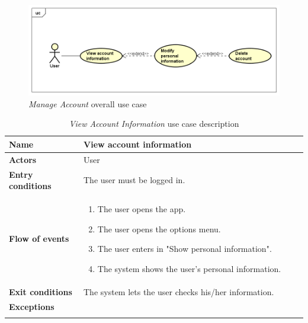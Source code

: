 \begin{figure}[h]
	\includegraphics[width=\textwidth, height=\textheight, keepaspectratio=true]{Img/ManageAccountUC}
	\caption{\emph{Manage Account} overall use case}
	\label{fig:manageaccountuc}
\end{figure}

\newpage
\begin{longtable}{p{0.25\linewidth}|p{0.75\linewidth}}
	\hline
	\label{tab:viewaccountusecase}
	\textbf{Name} & \textbf{View account information} \\
	\hline
	\textbf{Actors} & User \\
	\hline
	\textbf{Entry conditions} & The user must be logged in.\\
	\hline
	\textbf{Flow of events} & 
	\begin{enumerate}
		\item The user opens the app.
		\item The user opens the options menu.
		\item The user enters in "Show personal information".
		\item The system shows the user's personal information.
	\end{enumerate}\\
	\hline
	\textbf{Exit conditions} & The system lets the user checks his/her information.\\
	\hline
	\textbf{Exceptions} & \- \\
	\hline
	\caption{\emph{View Account Information} use case description}
\end{longtable}

